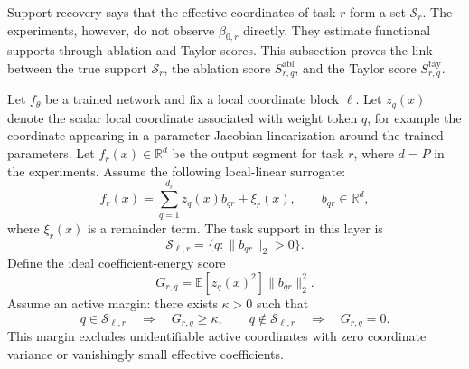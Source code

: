 \documentclass{article}
\begin{document}
Support recovery says that the effective coordinates of task \(r\) form a set \(\mathcal S_r\). The experiments, however, do not observe \(\beta_{0,r}\) directly. They estimate functional supports through ablation and Taylor scores. This subsection proves the link between the true support \(\mathcal S_r\), the ablation score \(S^{\mathrm{abl}}_{r,q}\), and the Taylor score \(S^{\mathrm{tay}}_{r,q}\).

Let \(f_\theta\) be a trained network and fix a local coordinate block \(\ell\). Let \(z_q(x)\) denote the scalar local coordinate associated with weight token \(q\), for example the coordinate appearing in a parameter-Jacobian linearization around the trained parameters. Let \(f_r(x)\in\mathbb R^d\) be the output segment for task \(r\), where \(d=P\) in the experiments. Assume the following local-linear surrogate:
\begin{equation}
f_r(x)=\sum_{q=1}^{d_\ell}z_q(x)b_{qr}+\xi_r(x),
\qquad
b_{qr}\in\mathbb R^d,
\label{eq:local_linear_hidden_lgamma}
\end{equation}
where \(\xi_r(x)\) is a remainder term. The task support in this layer is
\begin{equation}
\mathcal S_{\ell,r}=\{q:\|b_{qr}\|_2>0\}.
\end{equation}
Define the ideal coefficient-energy score
\begin{equation}
G_{r,q}=\mathbb E\left[z_q(x)^2\right]\|b_{qr}\|_2^2 .
\label{eq:ideal_energy_score_lgamma}
\end{equation}
Assume an active margin: there exists \(\kappa>0\) such that
\begin{equation}
q\in\mathcal S_{\ell,r}\quad\Rightarrow\quad G_{r,q}\ge\kappa,
\qquad
q\notin\mathcal S_{\ell,r}\quad\Rightarrow\quad G_{r,q}=0 .
\label{eq:active_score_margin_lgamma}
\end{equation}
This margin excludes unidentifiable active coordinates with zero coordinate variance or vanishingly small effective coefficients.
\end{document}
